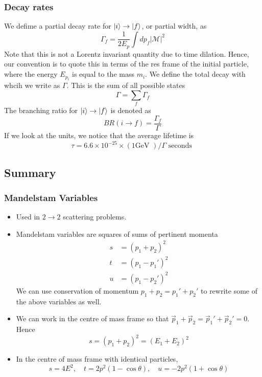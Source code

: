 \subsubsection{Decay rates} 
We defime a partial decay rate for $ \ket{ i } \to \ket{ f } $, 
or partial width, as 
\[
\Gamma _f = \frac{1}{ 2 E_ p } \int d p _ f | \mathcal{ M } | ^ 2  
\] Note that this is not a Lorentz invariant 
quantity due to time dilation. 
Hence, our convention is to quote this in terms 
of the res frame of the initial particle, 
where the energy $E _{ p _ i } $ is equal to 
the mass $ m _ i $. 
We define the total decay with whcih we write as  $ \Gamma $. 
This is the sum of all possible states 
 \[
\Gamma = \sum _ f  \Gamma _ f  
\]
The branching ratio for $\ket{ i } \to \ket { f} $ is denoted as 
\[
 BR ( i \to f )  = \frac{\Gamma_ f }{ \Gamma}
\] If we look at the units, we notice that the average 
lifetime is 
\[
	\tau = 6.6 \times 10 ^{ - 25 } \times ( 1 \text{GeV } ) / \Gamma \text{ seconds }
\]

\subsection*{Summary}

\subsubsection*{Mandelstam Variables }
\begin{itemize}
	\item Used in $ 2 \to 2 $ scattering 
		problems. 
	\item Mandelstam variables 
		are squares of sums of pertinent momenta 
	\begin{align*}
		s &=  \left( p_1 + p_2  \right)  ^ 2  \\ 
		t &=  \left( p_1 - p_1'  \right)  ^ 2  \\ 
		u &=  \left( p_1 - p_2 '  \right)  ^ 2  
	\end{align*}
	We can use conservation of momentum $ p_1 + p_2 = 
	p_1 ' + p_2 ' $ to rewrite some of the above variables as well. 
\item We can work in the centre of mass frame so that 
	$ \vec{p}_ 1  + \vec{p} _ 2  = \vec{p} _ 1 ' + \vec{p} _ 2 ' 
	 = 0 $. Hence 
	 \[
		 s = \left( p_1 + p_2  \right)  ^ 2  = \left( 
		 E_1 + E_2 \right)  ^ 2
	 \]
 \item In the centre of mass frame with identical particles, 
	 \[
	  s = 4 E ^ 2 , \quad t = 2 p ^ 2 \left( 1 - 
	  \cos \theta  \right), \quad u =  - 2p ^ 2 \left( 
  1 + \cos \theta \right)  
	 \]
\end{itemize}

